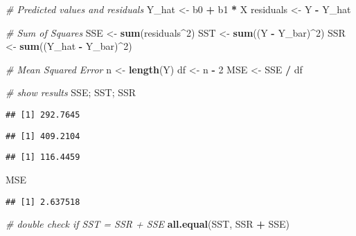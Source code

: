 \documentclass[
]{article}
\newenvironment{Shaded}{\begin{snugshade}}{\end{snugshade}}
\newcommand{\CommentTok}[1]{\textcolor[rgb]{0.56,0.35,0.01}{\textit{#1}}}
\newcommand{\DecValTok}[1]{\textcolor[rgb]{0.00,0.00,0.81}{#1}}
\newcommand{\FunctionTok}[1]{\textcolor[rgb]{0.13,0.29,0.53}{\textbf{#1}}}
\newcommand{\NormalTok}[1]{#1}
\newcommand{\OtherTok}[1]{\textcolor[rgb]{0.56,0.35,0.01}{#1}}
\newcommand{\SpecialCharTok}[1]{\textcolor[rgb]{0.81,0.36,0.00}{\textbf{#1}}}
\begin{document}
\begin{Shaded}
\begin{Highlighting}[]
\CommentTok{\# Predicted values and residuals}
\NormalTok{Y\_hat }\OtherTok{\textless{}{-}}\NormalTok{ b0 }\SpecialCharTok{+}\NormalTok{ b1 }\SpecialCharTok{*}\NormalTok{ X}
\NormalTok{residuals }\OtherTok{\textless{}{-}}\NormalTok{ Y }\SpecialCharTok{{-}}\NormalTok{ Y\_hat}

\CommentTok{\# Sum of Squares}
\NormalTok{SSE }\OtherTok{\textless{}{-}} \FunctionTok{sum}\NormalTok{(residuals}\SpecialCharTok{\^{}}\DecValTok{2}\NormalTok{)}
\NormalTok{SST }\OtherTok{\textless{}{-}} \FunctionTok{sum}\NormalTok{((Y }\SpecialCharTok{{-}}\NormalTok{ Y\_bar)}\SpecialCharTok{\^{}}\DecValTok{2}\NormalTok{)}
\NormalTok{SSR }\OtherTok{\textless{}{-}} \FunctionTok{sum}\NormalTok{((Y\_hat }\SpecialCharTok{{-}}\NormalTok{ Y\_bar)}\SpecialCharTok{\^{}}\DecValTok{2}\NormalTok{)}

\CommentTok{\# Mean Squared Error}
\NormalTok{n }\OtherTok{\textless{}{-}} \FunctionTok{length}\NormalTok{(Y)}
\NormalTok{df }\OtherTok{\textless{}{-}}\NormalTok{ n }\SpecialCharTok{{-}} \DecValTok{2}
\NormalTok{MSE }\OtherTok{\textless{}{-}}\NormalTok{ SSE }\SpecialCharTok{/}\NormalTok{ df}

\CommentTok{\# show results}
\NormalTok{SSE; SST; SSR}
\end{Highlighting}
\end{Shaded}

\begin{verbatim}
## [1] 292.7645
\end{verbatim}

\begin{verbatim}
## [1] 409.2104
\end{verbatim}

\begin{verbatim}
## [1] 116.4459
\end{verbatim}

\begin{Shaded}
\begin{Highlighting}[]
\NormalTok{MSE}
\end{Highlighting}
\end{Shaded}

\begin{verbatim}
## [1] 2.637518
\end{verbatim}

\begin{Shaded}
\begin{Highlighting}[]
\CommentTok{\# double check if SST = SSR + SSE}
\FunctionTok{all.equal}\NormalTok{(SST, SSR }\SpecialCharTok{+}\NormalTok{ SSE)}
\end{Highlighting}
\end{Shaded}
\end{document}
